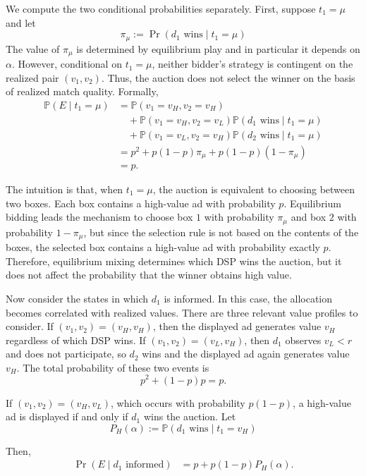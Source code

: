 \noindent We compute the two conditional probabilities separately. First, suppose $ t_1 = \mu $ and let
\[
\pi_\mu:=\Pr(d_1\text{ wins}\mid t_1=\mu)
\]
The value of $\pi_\mu$ is determined by equilibrium play and in particular it depends on $ \alpha $. However, conditional on $ t_1 = \mu $, neither bidder's strategy is contingent on the realized pair $ (v_1,v_2) $. Thus, the auction does not select the winner on the basis of realized match quality. Formally,
\begin{align*}
\mathbb{P}(E \mid t_1 = \mu)
&=
\mathbb{P}(v_1=v_H,v_2=v_H) \\
&\quad+
\mathbb{P}(v_1=v_H,v_2=v_L)\mathbb{P}(d_1\text{ wins}\mid t_1=\mu) \\
&\quad+
\mathbb{P}(v_1=v_L,v_2=v_H)\mathbb{P}(d_2\text{ wins}\mid t_1=\mu) \\
&=
p^2+p(1-p)\pi_\mu+p(1-p)(1-\pi_\mu) \\
&=p.
\end{align*}

\noindent The intuition is that, when $ t_1 = \mu $, the auction is equivalent to choosing between two boxes. Each box contains a high-value ad with probability $ p $. Equilibrium bidding leads the mechanism to choose box $ 1 $ with probability $ \pi_\mu $ and box $ 2 $ with probability $ 1 - \pi_\mu $, but since the selection rule is not based on the contents of the boxes, the selected box contains a high-value ad with probability exactly $ p $. Therefore, equilibrium mixing determines which DSP wins the auction, but it does not affect the probability that the winner obtains high value.

Now consider the states in which $ d_1 $ is informed. In this case, the allocation becomes correlated with realized values. There are three relevant value profiles to consider. If $ (v_1,v_2) = (v_H,v_H) $, then the displayed ad generates value $v_H$ regardless of which DSP wins. If $(v_1,v_2)=(v_L,v_H)$, then $d_1$ observes $v_L<r$ and does not participate, so $d_2$ wins and the displayed ad again generates value $v_H$. The total probability of these two events is
\[
p^2+(1-p)p=p.
\]

\noindent If $ (v_1,v_2) = (v_H,v_L) $, which occurs with probability $ p(1-p) $, a high-value ad is displayed if and only if $ d_1 $ wins the auction. Let
\[
P_H(\alpha):=\mathbb{P}(d_1\text{ wins} \mid t_1=v_H)
\]

\noindent Then,
\begin{align*}
\Pr(E\mid d_1\text{ informed})
&=
p+p(1-p)P_H(\alpha).
\end{align*}

